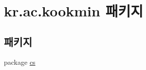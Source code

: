 \hypertarget{namespacekr_1_1ac_1_1kookmin}{}\section{kr.\+ac.\+kookmin 패키지}
\label{namespacekr_1_1ac_1_1kookmin}
\subsection*{패키지}
\begin{DoxyCompactItemize}
\item 
package \hyperlink{namespacekr_1_1ac_1_1kookmin_1_1cs}{cs}
\end{DoxyCompactItemize}
